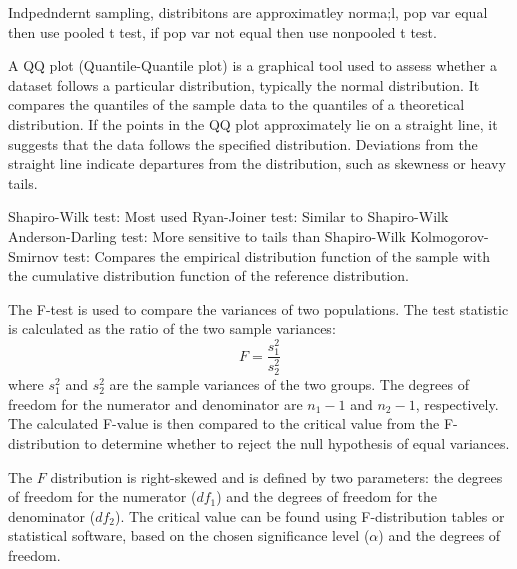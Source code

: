 \documentclass[answers,12pt,addpoints]{exam}
\begin{document}
\begin{remark}
    Indpedndernt sampling, distribitons are approximatley norma;l, pop var equal then use pooled t test, if pop var not equal then use nonpooled t test.
\end{remark}

\begin{definition}[QQ plot]
    A QQ plot (Quantile-Quantile plot) is a graphical tool used to assess whether a dataset follows a particular distribution, typically the normal distribution. It compares the quantiles of the sample data to the quantiles of a theoretical distribution. If the points in the QQ plot approximately lie on a straight line, it suggests that the data follows the specified distribution. Deviations from the straight line indicate departures from the distribution, such as skewness or heavy tails.
\end{definition}

\begin{remark}

    Shapiro-Wilk test: Most used
    Ryan-Joiner test: Similar to Shapiro-Wilk
    Anderson-Darling test: More sensitive to tails than Shapiro-Wilk
    Kolmogorov-Smirnov test: Compares the empirical distribution function of the sample with the cumulative distribution function of the reference distribution.
\end{remark}

\begin{definition}

    The F-test is used to compare the variances of two populations. The test statistic is calculated as the ratio of the two sample variances:
    \[
    F = \frac{s_1^2}{s_2^2}
    \]
    where $s_1^2$ and $s_2^2$ are the sample variances of the two groups. The degrees of freedom for the numerator and denominator are $n_1 - 1$ and $n_2 - 1$, respectively. The calculated F-value is then compared to the critical value from the F-distribution to determine whether to reject the null hypothesis of equal variances.

    The $F$ distribution is right-skewed and is defined by two parameters: the degrees of freedom for the numerator ($df_1$) and the degrees of freedom for the denominator ($df_2$). The critical value can be found using F-distribution tables or statistical software, based on the chosen significance level ($\alpha$) and the degrees of freedom.
\end{definition}
\end{document}

